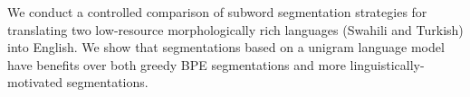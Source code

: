 We conduct a controlled comparison of subword segmentation strategies for translating two low-resource morphologically rich languages (Swahili and Turkish) into English. We show that segmentations based on a unigram language model have benefits over both greedy BPE segmentations and more linguistically-motivated segmentations.
